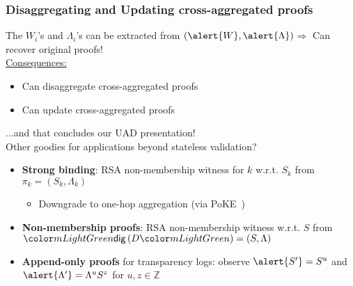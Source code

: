 \begin{frame}
    \frametitle{Disaggregating and Updating cross-aggregated proofs}
    The $W_i$'s and $\Lambda_i$'s can be extracted from $(\alert{W},\alert{\Lambda})$\pause\xspace $\Rightarrow$ Can recover original proofs!\pause\\
    \vspace{1em}
    \underline{Consequences:}\pause
    \begin{itemize}
        \item Can disaggregate cross-aggregated proofs\pause
        \item Can update cross-aggregated proofs\pause
    \end{itemize}
    ...and that concludes our UAD presentation!\pause\\
    \vspace{1em}
    \alert{Other goodies} for applications beyond stateless validation?\pause
    \begin{itemize}
        \item \textbf{Strong binding}\pause: RSA non-membership witness for $k$ w.r.t. $S_k$ from $\pi_k=(S_k, \Lambda_k)$\pause
        \begin{itemize}
            \item Downgrade to one-hop aggregation (via \alert{PoKE}~\cite{BBF18})\pause
        \end{itemize}
        \item \textbf{Non-membership proofs}\pause: RSA non-membership witness w.r.t. $S$ from $\dig{D}=(S,\Lambda)$\pause
        \item \textbf{Append-only proofs} for transparency logs:\pause\xspace observe $\alert{S'} = S^u$ and $\alert{\Lambda'} = \Lambda^u S^z$ for $u,z\in \mathbb{Z}$
    \end{itemize}
\end{frame}

